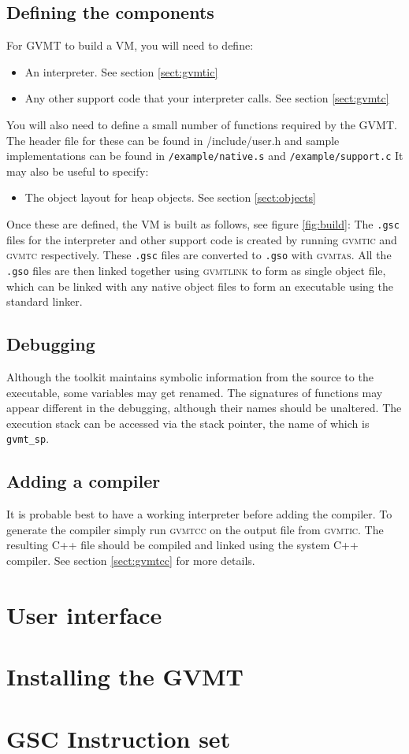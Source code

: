 \documentclass[a4paper,10pt]{report}
\newcommand{\gvmtic}{\textsc{gvmtic}}
\newcommand{\gvmtc}{\textsc{gvmtc}}
\newcommand{\glink}{\textsc{gvmtlink}}
\newcommand{\gvmtas}{\textsc{gvmtas}}
\newcommand{\gvmtcc}{\textsc{gvmtcc}}
\begin{document}
\section{Defining the components}
For GVMT to build a VM, you will need to define:
\begin{itemize}
\item An interpreter. See section \ref{sect:gvmtic}
\item Any other support code that your interpreter calls. See section \ref{sect:gvmtc}
\end{itemize}
You will also need to define a small number of functions required by the GVMT. The header file for these can be found in /include/user.h and sample implementations can be found in \verb|/example/native.s| and \verb|/example/support.c|
It may also be useful to specify:
\begin{itemize}
\item The object layout for heap objects. See section \ref{sect:objects}
\end{itemize}

Once these are defined, the VM is built as follows, see figure \ref{fig:build}: The \verb|.gsc| files for the interpreter and other support code is created by running \gvmtic{} and \gvmtc{} respectively. These  \verb|.gsc| files are converted to \verb|.gso| with \gvmtas. All the  \verb|.gso| files are then linked together using \glink{} to form as single object file, which can be linked with any native object files to form an executable using the standard linker.

\section{Debugging}
Although the toolkit maintains symbolic information from the source to the executable, some variables may get renamed. 
The signatures of functions may appear different in the debugging, although their names should be unaltered.
The execution stack can be accessed via the stack pointer, the name of which is \verb|gvmt_sp|.

\section{Adding a compiler}
It is probable best to have a working interpreter before adding the compiler. To generate the compiler simply run \gvmtcc{} on the output file from \gvmtic. The resulting C++ file should be compiled and linked using the system C++ compiler. See section \ref{sect:gvmtcc} for more details.

\chapter{User interface}


\appendix

\chapter{Installing the GVMT}



\chapter{GSC Instruction set\label{app:inst}}
\small


\end{document}
